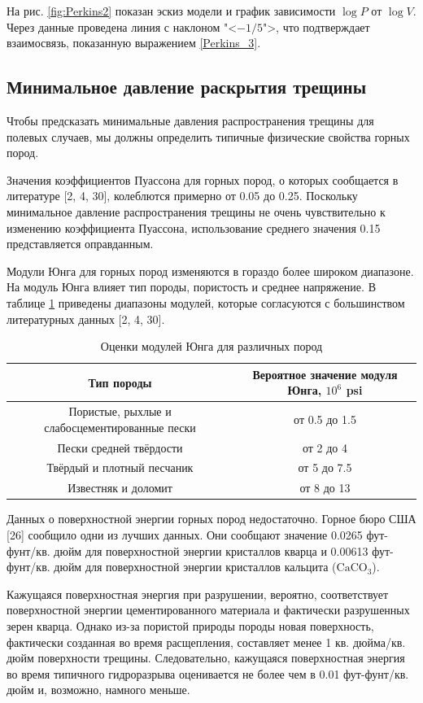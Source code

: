 \documentclass[a4paper, 12pt]{article}
\begin{document}
На рис. \ref{fig:Perkins2} показан эскиз модели и график зависимости $\log P$ от $\log V$.
Через данные проведена линия с наклоном "<$-1/5$">, что подтверждает взаимосвязь, показанную выражением \eqref{Perkins_3}.

\subsection{Минимальное давление раскрытия трещины}

Чтобы предсказать минимальные давления распространения трещины для полевых случаев, мы должны определить типичные физические свойства горных пород.

Значения коэффициентов Пуассона для горных пород, о которых сообщается в литературе [2, 4, 30], колеблются примерно от 0.05 до 0.25.
Поскольку минимальное давление распространения трещины не очень чувствительно к изменению коэффициента Пуассона, использование среднего значения 0.15 представляется оправданным.

Модули Юнга для горных пород изменяются в гораздо более широком диапазоне.
На модуль Юнга влияет тип породы, пористость и среднее напряжение.
В таблице \ref{tab:Perkins_table_1} приведены диапазоны модулей, которые согласуются с большинством литературных данных [2, 4, 30].

\begin{table}[htbp]
	\centering\small
	\caption{Оценки модулей Юнга для различных пород}
	\label{tab:Perkins_table_1}
		\begin{tabular}{|c|c|}
			\hline
			Тип породы&Вероятное значение модуля Юнга, $10^6$ psi\\
			\hline
			Пористые, рыхлые и слабосцементированные пески&от 0.5 до 1.5\\ \hline
			Пески средней твёрдости&от 2 до 4\\ \hline
			Твёрдый и плотный песчаник&от 5 до 7.5\\ \hline
			Известняк и доломит&от 8 до 13\\ \hline
		\end{tabular}
	\normalsize
\end{table}

Данных о поверхностной энергии горных пород недостаточно.
Горное бюро США [26] сообщило одни из лучших данных.
Они сообщают значение 0.0265 фут-фунт/кв. дюйм для поверхностной энергии кристаллов кварца и 0.00613 фут-фунт/кв. дюйм для поверхностной энергии кристаллов кальцита ($\text{CaCO}_3$).

Кажущаяся поверхностная энергия при разрушении, вероятно, соответствует поверхностной энергии цементированного материала и фактически разрушенных зерен кварца.
Однако из-за пористой природы породы новая поверхность, фактически созданная во время расщепления, составляет менее 1 кв. дюйма/кв. дюйм поверхности трещины.
Следовательно, кажущаяся поверхностная энергия во время типичного гидроразрыва оценивается не более чем в 0.01 фут-фунт/кв. дюйм и, возможно, намного меньше.
\end{document}
